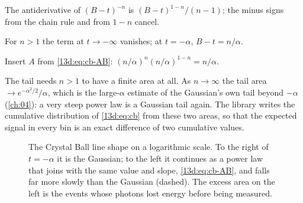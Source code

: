 \begin{explain}
  \item The antiderivative of $(B-t)^{-n}$ is $(B-t)^{1-n}/(n-1)$; the minus signs from
        the chain rule and from $1-n$ cancel.
  \item For $n>1$ the term at $t\to-\infty$ vanishes; at $t=-\alpha$, $B-t=n/\alpha$.
  \item Insert $A$ from \eqref{13d:eq:cb-AB}: $(n/\alpha)^n(n/\alpha)^{1-n}=n/\alpha$.
\end{explain}
The tail needs $n>1$ to have a finite area at all. As $n\to\infty$ the tail area
$\to e^{-\alpha^2/2}/\alpha$, which is the large-$\alpha$ estimate of the Gaussian's own tail
beyond $-\alpha$ (\cref{ch:04}): a very steep power law is a Gaussian tail again. The
library  writes the cumulative distribution of
\eqref{13d:eq:cb} from these two areas, so that the expected signal in every bin is an exact
difference of two cumulative values.

\begin{figure}[htbp]
\centering
{}
\caption{The Crystal Ball line shape on a logarithmic scale. To the right of $t=-\alpha$ it is
the Gaussian; to the left it continues as a power law that joins with the same value and
slope, \eqref{13d:eq:cb-AB}, and falls far more slowly than the Gaussian (dashed). The
excess area on the left is the events whose photons lost energy before being measured.}
\label{13d:fig:cb}
\end{figure}

